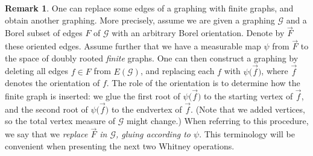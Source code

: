 \documentclass{article}
\theoremstyle{plain}
\theoremstyle{definition}
\newtheorem{rem}[thm]{Remark}
\newcommand{\cG}{\mathcal{G}}
\begin{document}
\begin{rem}
One can replace some edges of a graphing with finite graphs, and obtain another graphing. More precisely, assume we are given a graphing $\cG$ and a Borel subset of edges $F$ of $\cG$ with an arbitrary Borel orientation. Denote by $\vec{F}$ these oriented edges. Assume further that we have a measurable map $\psi$ from $\vec{F}$ to the space of doubly rooted \emph{finite} graphs. One can then construct a graphing by deleting all edges $f\in F$ from $E(\cG)$, and replacing each $f$ with $\psi\big(\vec{f}\big)$, where $\vec{f}$ denotes the orientation of $f$. The role of the orientation is to determine how the finite graph is inserted: we glue the first root of $\psi\big(\vec{f}\big)$ to the starting vertex of $\vec{f}$, and the second root of $\psi\big(\vec{f}\big)$ to the endvertex of $\vec{f}$. (Note that we added vertices, so the total vertex measure of $\cG$ might change.) When referring to this procedure, we say that we \emph{replace $\vec{F}$ in $\cG$, gluing according to $\psi$}. This terminology will be convenient when presenting the next two Whitney operations.  
\end{rem}
\end{document}
